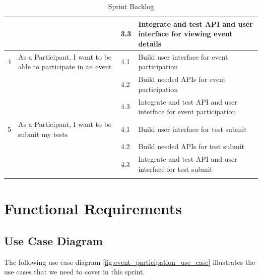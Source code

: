 \begin{longtable}{|p{2cm}|p{5cm}|p{2cm}|p{5cm}|}
                                             &                                                                & 3.3              & Integrate and test API and user interface for viewing event details \\ \hline
  4                                          & As a Participant, I want to be able to participate in an event & 4.1              & Build user interface for event participation                        \\ \cline{3-4}
                                             &                                                                & 4.2              & Build needed APIs for event participation                           \\ \cline{3-4}
                                             &                                                                & 4.3              & Integrate and test API and user interface for event participation   \\ \hline

  5                                          & As a Participant, I want to be submit my tests                 & 4.1              & Build user interface for test submit                                \\ \cline{3-4}
                                             &                                                                & 4.2              & Build needed APIs for test submit                                   \\ \cline{3-4}
                                             &                                                                & 4.3              & Integrate and test API and user interface for test submit           \\ \hline
  \caption{Sprint Backlog}
\end{longtable}

\section{Functional Requirements}
\subsection{Use Case Diagram}
The following use case diagram \ref{fig:event_participation_use_case} illustrates the use cases
that we need to cover in this sprint.

